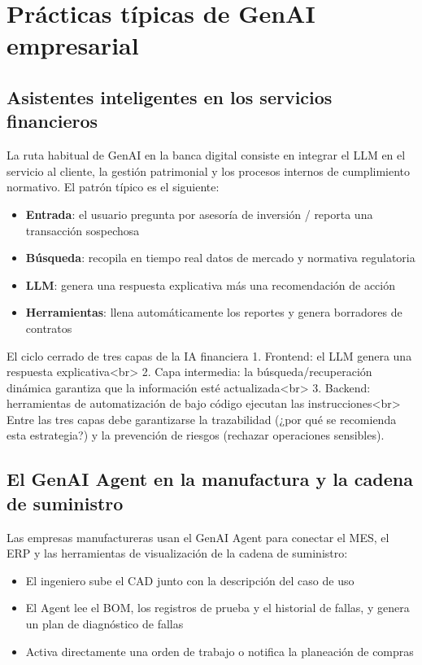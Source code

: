 \documentclass[a4paper]{article}
\begin{document}
\section{Prácticas típicas de GenAI empresarial}

\subsection{Asistentes inteligentes en los servicios financieros}

La ruta habitual de GenAI en la banca digital consiste en integrar el LLM en el servicio al cliente, la gestión patrimonial y los procesos internos de cumplimiento normativo. El patrón típico es el siguiente:

\begin{itemize}
    \item \textbf{Entrada}: el usuario pregunta por asesoría de inversión / reporta una transacción sospechosa
    \item \textbf{Búsqueda}: recopila en tiempo real datos de mercado y normativa regulatoria
    \item \textbf{LLM}: genera una respuesta explicativa más una recomendación de acción
    \item \textbf{Herramientas}: llena automáticamente los reportes y genera borradores de contratos
\end{itemize}

\begin{knowledgebox}{El ciclo cerrado de tres capas de la IA financiera}
1. Frontend: el LLM genera una respuesta explicativa<br>
2. Capa intermedia: la búsqueda/recuperación dinámica garantiza que la información esté actualizada<br>
3. Backend: herramientas de automatización de bajo código ejecutan las instrucciones<br>
Entre las tres capas debe garantizarse la trazabilidad (¿por qué se recomienda esta estrategia?) y la prevención de riesgos (rechazar operaciones sensibles).
\end{knowledgebox}

\subsection{El GenAI Agent en la manufactura y la cadena de suministro}

Las empresas manufactureras usan el GenAI Agent para conectar el MES, el ERP y las herramientas de visualización de la cadena de suministro:

\begin{itemize}
    \item El ingeniero sube el CAD junto con la descripción del caso de uso
    \item El Agent lee el BOM, los registros de prueba y el historial de fallas, y genera un plan de diagnóstico de fallas
    \item Activa directamente una orden de trabajo o notifica la planeación de compras
\end{itemize}
\end{document}
